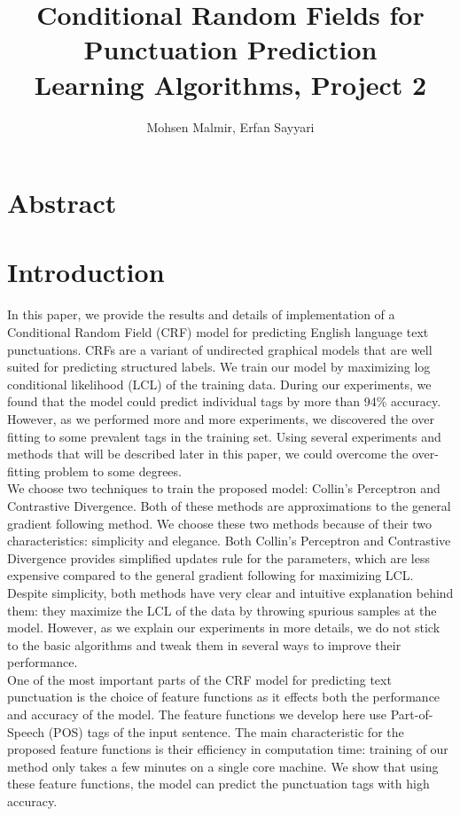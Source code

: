 \documentclass[twoside,12pt]{article}
\begin{document}
\title{ Conditional Random Fields for Punctuation Prediction\\  Learning Algorithms, Project 2}
\author{Mohsen Malmir, Erfan Sayyari}
\maketitle
\section{Abstract}

\section{Introduction}
In this paper, we provide the results and details of implementation of a Conditional Random Field (CRF) model for predicting English language text punctuations. CRFs are a variant of undirected graphical models that are well suited for predicting structured labels. We train our model by maximizing log conditional likelihood (LCL) of the training data. During our experiments, we found that the model could predict individual tags by more than 94\% accuracy. However, as we performed more and more experiments, we discovered the over fitting to some prevalent tags in the training set. Using several experiments and methods that will be described later in this paper, we could overcome the over-fitting problem to some degrees.\\
We choose two techniques to train the proposed model: Collin's Perceptron and Contrastive Divergence. Both of these methods are approximations to the general gradient following method. We choose these two methods because of their two characteristics: simplicity and elegance. Both Collin's Perceptron and Contrastive Divergence provides simplified updates rule for the parameters, which are less expensive compared to the general gradient following for maximizing LCL. Despite simplicity, both methods have very clear and intuitive explanation behind them: they maximize the LCL of the data by throwing spurious samples at the model. However, as we explain our experiments in more details, we do not stick to the basic algorithms and tweak them in several ways to improve their performance.\\
One of the most important parts of the CRF model for predicting text punctuation is the choice of feature functions as it effects both the performance and accuracy of the model. The feature functions we develop here use Part-of-Speech (POS) tags of the input sentence. The main characteristic for the proposed feature functions is their efficiency in computation time: training of our method only takes a few minutes on a single core machine. We show that using these feature functions, the model can predict the punctuation tags with high accuracy.\\ 
\end{document}
